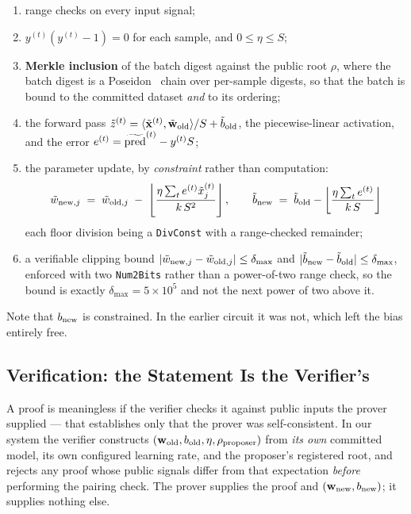 \documentclass{llncs}
\begin{document}
\begin{enumerate}
  \item range checks on every input signal;
  \item $y^{(t)}(y^{(t)} - 1) = 0$ for each sample, and $0 \le \eta \le S$;
  \item \textbf{Merkle inclusion} of the batch digest against the public root
    $\rho$, where the batch digest is a Poseidon~\cite{grassi2021poseidon} chain
    over per-sample digests, so that the batch is bound to the committed dataset
    \emph{and} to its ordering;
  \item the forward pass $\tilde z^{(t)} = \langle \tilde{\mathbf{x}}^{(t)},
    \tilde{\mathbf{w}}_{\rm old}\rangle / S + \tilde b_{\rm old}$, the
    piecewise-linear activation, and the error
    $e^{(t)} = \widetilde{\rm pred}^{(t)} - y^{(t)} S$;
  \item the parameter update, by \emph{constraint} rather than computation:
    \begin{equation}
      \tilde w_{{\rm new}, j} \;=\; \tilde w_{{\rm old}, j}
        \;-\; \left\lfloor \frac{\eta \sum_t e^{(t)} \tilde x^{(t)}_j}
                               {k\,S^2} \right\rfloor,
      \qquad
      \tilde b_{\rm new} \;=\; \tilde b_{\rm old}
        - \left\lfloor \frac{\eta \sum_t e^{(t)}}{k\,S} \right\rfloor
      \label{eq:update}
    \end{equation}
    each floor division being a \texttt{DivConst} with a range-checked
    remainder;
  \item a verifiable clipping bound $|\tilde w_{{\rm new}, j} - \tilde w_{{\rm
    old}, j}| \le \delta_{\max}$ and $|\tilde b_{\rm new} - \tilde b_{\rm old}|
    \le \delta_{\max}$, enforced with two \texttt{Num2Bits} rather than a
    power-of-two range check, so the bound is exactly $\delta_{\max} = 5 \times
    10^5$ and not the next power of two above it.
\end{enumerate}

Note that $b_{\rm new}$ is constrained. In the earlier circuit it was not, which
left the bias entirely free.

\subsection{Verification: the Statement Is the Verifier's}
\label{sec:verify}

A proof is meaningless if the verifier checks it against public inputs the
prover supplied --- that establishes only that the prover was self-consistent. In
our system the verifier constructs
$(\mathbf{w}_{\rm old}, b_{\rm old}, \eta, \rho_{\rm proposer})$ from
\emph{its own} committed model, its own configured learning rate, and the
proposer's registered root, and rejects any proof whose public signals differ
from that expectation \emph{before} performing the pairing check. The prover
supplies the proof and $(\mathbf{w}_{\rm new}, b_{\rm new})$; it supplies
nothing else.
\end{document}
